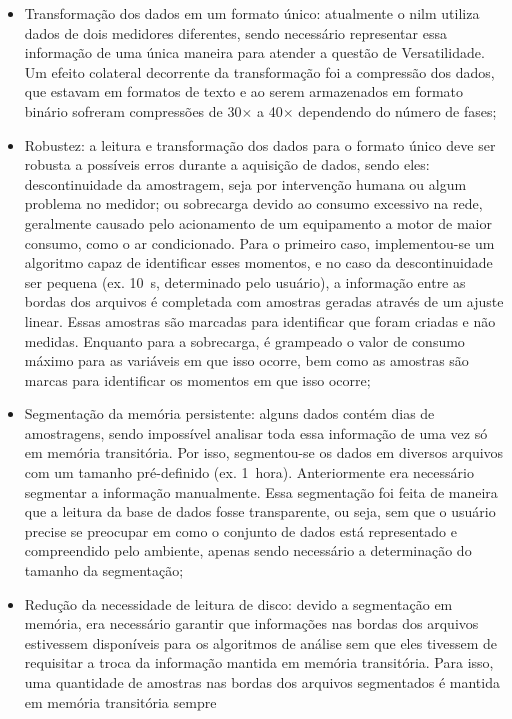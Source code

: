 \begin{itemize}
\item Transformação dos dados em um formato único: atualmente o
\gls{nilm} utiliza dados de dois medidores diferentes, sendo
necessário representar essa informação de uma única maneira para
atender a questão de Versatilidade. Um efeito colateral decorrente da
transformação foi a compressão dos dados, que estavam em formatos de
texto e ao serem armazenados em formato binário sofreram compressões de
30$\times$ a 40$\times$ dependendo do número de fases;
\item Robustez: a leitura e transformação dos dados para o formato
único deve ser robusta a possíveis erros durante a aquisição de dados,
sendo eles: descontinuidade da amostragem, seja por intervenção humana
ou algum problema no medidor; ou sobrecarga devido ao consumo
excessivo na rede, geralmente causado pelo acionamento de um equipamento
a motor de maior consumo, como o ar condicionado. Para o primeiro
caso, implementou-se um algoritmo capaz de identificar esses momentos,
e no caso da descontinuidade ser pequena (ex. 10~s, determinado pelo
usuário), a informação entre as bordas dos arquivos é completada com
amostras geradas através de um ajuste linear. Essas amostras são
marcadas para identificar que foram criadas e não medidas. Enquanto
para a sobrecarga, é grampeado o valor de consumo máximo para as
variáveis em que isso ocorre, bem como as amostras são marcas para
identificar os momentos em que isso ocorre;
\item Segmentação da memória persistente: alguns dados contém dias de
amostragens, sendo impossível analisar toda essa informação de uma vez
só em memória transitória. Por isso, segmentou-se os dados em diversos
arquivos com um tamanho pré-definido (ex. 1~hora). Anteriormente era
necessário segmentar a informação manualmente. Essa segmentação foi
feita de maneira que a leitura da base de dados fosse transparente,
ou seja, sem que o usuário precise se preocupar em como o conjunto de
dados está representado e compreendido pelo ambiente, apenas sendo
necessário a determinação do tamanho da segmentação;
\item Redução da necessidade de leitura de disco: devido a segmentação
em memória, era necessário garantir que informações nas bordas dos
arquivos estivessem disponíveis para os algoritmos de análise sem que
eles tivessem de requisitar a troca da informação mantida em memória
transitória. Para isso, uma quantidade de amostras nas bordas dos
arquivos segmentados é mantida em memória transitória sempre

\end{itemize}
